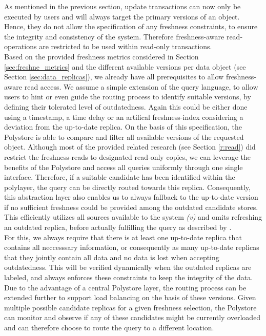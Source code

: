 As mentioned in the previous section, update transactions can now only be executed by users and will always target the primary versions of an object.
Hence, they do not allow the specification of any freshness constraints, to ensure the integrity and consistency of the system.
Therefore freshness-aware read-operations are restricted to be used within read-only transactions.\\
Based on the provided freshness metrics considered in Section \ref{sec:freshne_metrics} and the different available versions per data object (see Section \ref{sec:data_replicas}),
we already have all prerequisites to allow freshness-aware read access. 
We assume a simple extension of the query language, to allow users to hint or even guide the routing process to identify suitable versions, 
by defining their tolerated level of outdatedness.
Again this could be either done using a timestamp, a time delay or an artifical freshness-index considering a deviation from the up-to-date replica.
On the basis of this specification, the Polystore is able to compare and filter all available versions of the requested object.
Although most of the provided related research (see Section \ref{r:read}) did restrict the freshness-reads to designated read-only copies, we can leverage the benefits 
of the Polystore and access all queries uniformly through one single interface. Therefore, if a suitable candidate has been identified within the polylayer, 
the query can be directly routed towards this replica. Consequently, this abstraction layer also enables us to always fallback to the up-to-date version
if no sufficient freshness could be provided among the outdated candidate stores. This efficiently utilizes all sources available to the system \textit{(v)}
and omits refreshing an outdated replica, before actually fulfilling the query as described by \cite{voicu:2010}.\\
For this, we always require that there is at least one up-to-date replica that contains all neccesssary information, or consequently as many up-to-date replicas 
that they jointly contain all data and no data is lost when accepting outdatedness.
This will be verified dynamically when the outdated replicas are labeled, and always enforces these constraints to keep the integrity of the data.
Due to the advantage of a central Polystore layer, the routing process can be extended further to support load balancing on the basis of these versions. 
Given multiple possible candidate replicas for a given freshness selection, the Polystore can monitor and observe 
if any of these candidates might be currently overloaded and can therefore choose to route the query to a different location.
